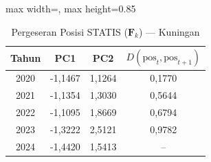 \begin{table}[H]
\centering
\caption{Pergeseran Posisi STATIS ($\mathbf{F}_k$) --- Kuningan} \label{tab:app2jarak_statis_skor_kuningan}
\begin{adjustbox}{max width=\textwidth, max height=0.85\textheight}
\begin{tabular}{|c|c|c|c|}
\hline
\textbf{Tahun} & \textbf{PC1} & \textbf{PC2} & \textbf{$D(\text{pos}_t, \text{pos}_{t+1})$} \\
\hline
2020 & -1,1467 & 1,1264 & 0,1770 \\
2021 & -1,1354 & 1,3030 & 0,5644 \\
2022 & -1,1095 & 1,8669 & 0,6794 \\
2023 & -1,3222 & 2,5121 & 0,9782 \\
2024 & -1,4420 & 1,5413 & -- \\
\hline
\end{tabular}
\end{adjustbox}
\end{table}